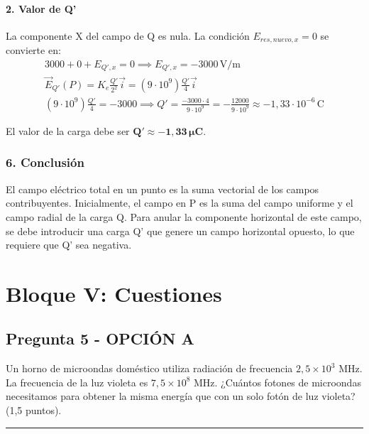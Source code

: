\paragraph{2. Valor de Q'}
La componente X del campo de Q es nula. La condición $E_{res, nuevo, x} = 0$ se convierte en:
\begin{gather}
    3000 + 0 + E_{Q',x} = 0 \implies E_{Q',x} = -3000\,\text{V/m} \\
    \vec{E}_{Q'}(P) = K_e \frac{Q'}{2^2}\vec{i} = (9\cdot 10^9)\frac{Q'}{4}\vec{i} \\
    (9\cdot 10^9)\frac{Q'}{4} = -3000 \implies Q' = \frac{-3000 \cdot 4}{9\cdot 10^9} = -\frac{12000}{9\cdot 10^9} \approx -1,33\cdot 10^{-6}\,\text{C}
\end{gather}
\begin{cajaresultado}
El valor de la carga debe ser $\boldsymbol{Q' \approx -1,33\,\mu\textbf{C}}$.
\end{cajaresultado}

\subsubsection*{6. Conclusión}
\begin{cajaconclusion}
El campo eléctrico total en un punto es la suma vectorial de los campos contribuyentes. Inicialmente, el campo en P es la suma del campo uniforme y el campo radial de la carga Q. Para anular la componente horizontal de este campo, se debe introducir una carga Q' que genere un campo horizontal opuesto, lo que requiere que Q' sea negativa.
\end{cajaconclusion}

\newpage

\section{Bloque V: Cuestiones}
\label{sec:moderna1_2007_sep_ext}

\subsection{Pregunta 5 - OPCIÓN A}
\label{subsec:5A_2007_sep_ext}

\begin{cajaenunciado}
Un horno de microondas doméstico utiliza radiación de frecuencia $2,5\times10^{3}$ MHz. La frecuencia de la luz violeta es $7,5\times10^{8}$ MHz. ¿Cuántos fotones de microondas necesitamos para obtener la misma energía que con un solo fotón de luz violeta? (1,5 puntos).
\end{cajaenunciado}
\hrule

